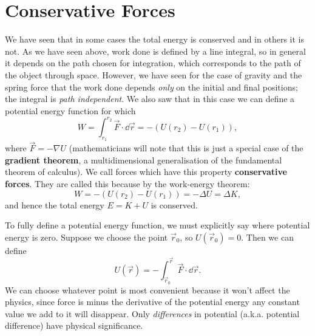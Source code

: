 \documentclass[../classical_mechanics.tex]{subfiles}
\begin{document}
    \section{Conservative Forces}\label{sec:conservative-forces}
        We have seen that in some cases the total energy is conserved and in others it is not.
        As we have seen above, work done is defined by a line integral, so in general it depends on the path chosen for integration, which corresponds to the path of the object through space.
        However, we have seen for the case of gravity and the spring force that the work done depends \textit{only} on the initial and final positions; the integral is \textit{path independent}.
        We also saw that in this case we can define a potential energy function for which
        \begin{equation}
            W=\int_{r_1}^{r_2}\vec{F}\cdot\dd{\vec{r}}=-(U(r_2)-U(r_1)),
        \end{equation}
        where $\vec{F}=-\nabla U$ (mathematicians will note that this is just a special case of the \textbf{gradient theorem}, a multidimensional generalisation of the fundamental theorem of calculus).
        We call forces which have this property \textbf{conservative forces}.
        They are called this because by the work-energy theorem:
        \begin{equation}
            W=-(U(r_2)-U(r_1))=-\Delta U=\Delta K,
        \end{equation}
        and hence the total energy $E=K+U$ is conserved.

        To fully define a potential energy function, we must explicitly say where potential energy is zero.
        Suppose we choose the point $\vec{r}_0$, so $U(\vec{r}_0)=0$.
        Then we can define
        \begin{equation}
            U(\vec{r})=-\int_{\vec{r}_0}^{\vec{r}}\vec{F}\cdot\dd{\vec{r}}.
        \end{equation}
        We can choose whatever point is most convenient because it won't affect the physics, since force is minus the derivative of the potential energy any constant value we add to it will disappear.
        Only \textit{differences} in potential (a.k.a. potential difference) have physical significance.
\end{document}
